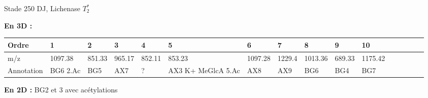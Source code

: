 \documentclass[10pt]{beamer}
\begin{document}
\begin{frame}{Stade 250 DJ, Lichenase}
  $T_2^*$

  \textbf{En 3D :}
  \vspace{-0.4cm}
    \begin{table}[]
    \centering
    \begin{adjustbox}{max width=1\textwidth}
      \begin{tabular}{llllllllllllllll}
        \toprule
        Ordre & 1       & 2       & 3       & 4       & 5       & 6       & 7       & 8       & 9       & 10       \\
        \midrule
        m/z &     1097.38 & 851.33 & 965.17 & 852.11 & 853.23 & 1097.28 & 1229.4 & 1013.36 & 689.33 & 1175.42 \\
        Annotation &  BG6 2.Ac & BG5 & AX7 & ? & AX3 K+ MeGlcA 5.Ac & AX8 & AX9 & BG6 & BG4 & BG7\\
        \bottomrule
      \end{tabular}
    \end{adjustbox}
  \end{table}




  \textbf{En 2D :} BG2 et 3 avec acétylations


\end{frame}
\end{document}
